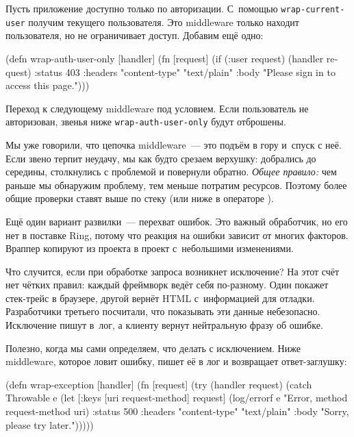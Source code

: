 Пусть приложение доступно только по авторизации. С~помощью
\verb|wrap-current-user| получим текущего пользователя. Это middleware только
находит пользователя, но не ограничивает доступ. Добавим ещё одно:


\begin{english}
  \begin{clojure}
(defn wrap-auth-user-only [handler]
  (fn [request]
    (if (:user request)
      (handler request)
      {:status 403
       :headers {"content-type" "text/plain"}
       :body "Please sign in to access this page."})))
  \end{clojure}
\end{english}

Переход к следующему middleware под условием. Если пользователь не
авторизован, звенья ниже \verb|wrap-auth-user-only| будут отброшены.

Мы уже говорили, что цепочка middleware~--- это подъём в гору и~спуск с
неё. Если звено терпит неудачу, мы как будто срезаем верхушку: добрались до
середины, столкнулись с проблемой и повернули обратно. \emph{Общее правило:} чем
раньше мы обнаружим проблему, тем меньше потратим ресурсов. Поэтому более общие
проверки ставят выше по стеку (или ниже в операторе \arr).


Ещё один вариант развилки~--- перехват ошибок. Это важный обработчик, но его
нет в поставке Ring, потому что реакция на ошибки зависит от многих
факторов. Враппер копируют из проекта в проект с~небольшими изменениями.

Что случится, если при обработке запроса возникнет исключение? На этот счёт
нет чётких правил: каждый фреймворк ведёт себя по-разному. Один покажет
стек-трейс в браузере, другой вернёт HTML с~информацией для
отладки. Разработчики третьего посчитали, что показывать эти данные
небезопасно. Исключение пишут в~лог, а клиенту вернут нейтральную фразу об
ошибке.

Полезно, когда мы сами определяем, что делать с исключением. Ниже middleware,
которое ловит ошибку, пишет её в лог и возвращает ответ-заглушку:


\begin{english}
  \begin{clojure}
(defn wrap-exception [handler]
  (fn [request]
    (try
      (handler request)
      (catch Throwable e
        (let [{:keys [uri request-method]} request]
          (log/errorf e "Error, method %
                      request-method uri)
          {:status 500
           :headers {"content-type" "text/plain"}
           :body "Sorry, please try later."})))))
  \end{clojure}
\end{english}

